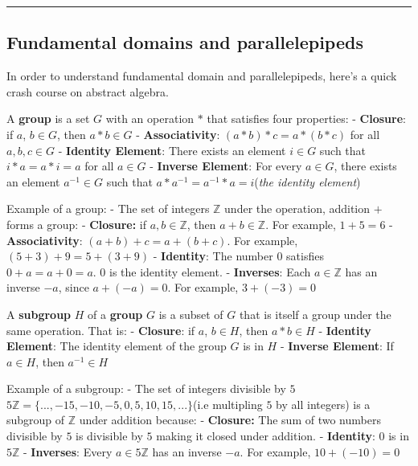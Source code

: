 \documentclass[11pt]{article}
\begin{document}
\begin{center}\rule{0.5\linewidth}{0.5pt}\end{center}

    \subsection{Fundamental domains and
parallelepipeds}\label{fundamental-domains-and-parallelepipeds}

In order to understand fundamental domain and parallelepipeds, here's a
quick crash course on abstract algebra.

A \textbf{group} is a set \(G\) with an operation \(*\) that satisfies
four properties: - \textbf{Closure}: if \(a\), \(b \in G\), then
\(a * b \in G\) - \textbf{Associativity}: \((a * b) * c = a * (b * c)\)
for all \(a, b, c \in G\) - \textbf{Identity Element}: There exists an
element \(i \in G\) such that \(i * a = a * i= a\) for all \(a \in G\) -
\textbf{Inverse Element}: For every \(a \in G\), there exists an element
\(a^{-1} \in G\) such that \(a * a^{-1} = a^{-1} * a = i\)(\emph{the
identity element})

Example of a group: - The set of integers \(\mathbb{Z}\) under the
operation, addition \(+\) forms a group: - \textbf{Closure:} if
\(a, b \in \mathbb{Z}\), then \(a + b \in \mathbb{Z}\). For example,
\(1 + 5 = 6\) - \textbf{Associativity}: \((a + b) + c = a + (b + c)\).
For example, \((5 + 3) + 9 = 5 + (3 + 9)\) - \textbf{Identity}: The
number \(0\) satisfies \(0 + a = a + 0 = a\). \(0\) is the identity
element. - \textbf{Inverses}: Each \(a \in \mathbb{Z}\) has an inverse
\(-a\), since \(a + (-a) = 0\). For example, \(3 + (-3) = 0\)

A \textbf{subgroup} \(H\) of a \textbf{group} \(G\) is a subset of \(G\)
that is itself a group under the same operation. That is: -
\textbf{Closure}: if \(a\), \(b \in H\), then \(a * b \in H\) -
\textbf{Identity Element}: The identity element of the group \(G\) is in
\(H\) - \textbf{Inverse Element}: If \(a \in H\), then \(a^{-1} \in H\)

Example of a subgroup: - The set of integers divisible by \(5\)
\(5\mathbb{Z} = \{..., -15, -10, -5, 0, 5, 10, 15,...\}\)(i.e multipling
\(5\) by all integers) is a subgroup of \(\mathbb{Z}\) under addition
because: - \textbf{Closure:} The sum of two numbers divisible by \(5\)
is divisible by \(5\) making it closed under addition. -
\textbf{Identity}: \(0\) is in \(5\mathbb{Z}\) - \textbf{Inverses}:
Every \(a \in 5\mathbb{Z}\) has an inverse \(-a\). For example,
\(10 + (-10) = 0\)
\end{document}
